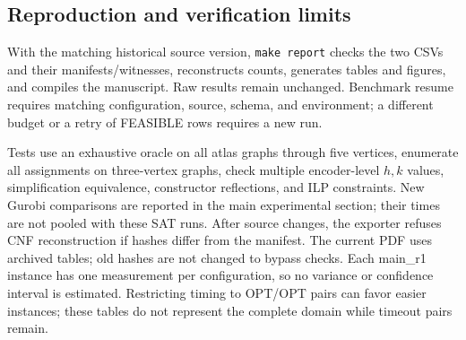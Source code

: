 \subsection{Reproduction and verification limits}
With the matching historical source version, \texttt{make report} checks
the two CSVs and their manifests/witnesses, reconstructs counts, generates
tables and figures, and compiles the manuscript. Raw results remain unchanged.
Benchmark resume requires matching configuration, source, schema, and environment;
a different budget or a retry of FEASIBLE rows requires a new run.

Tests use an exhaustive oracle on all atlas graphs through five vertices,
enumerate all assignments on three-vertex graphs, check multiple encoder-level
$h,k$ values, simplification equivalence, constructor reflections, and ILP
constraints. New Gurobi comparisons are reported in the main experimental
section; their times are not pooled with these SAT runs. After source changes,
the exporter refuses CNF reconstruction if hashes differ from the manifest.
The current PDF uses archived tables; old hashes are not changed to bypass checks.
Each main\_r1 instance has one measurement per configuration, so no variance
or confidence interval is estimated. Restricting timing to OPT/OPT pairs
can favor easier instances; these tables do not represent the complete domain
while timeout pairs remain.
